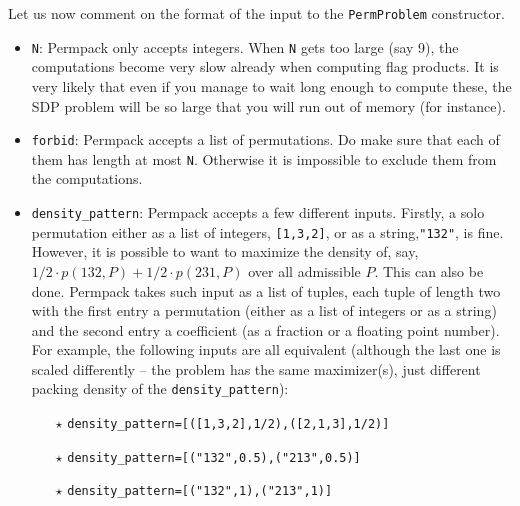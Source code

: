 Let us now comment on the format of the input to the \texttt{PermProblem} constructor. 
\begin{itemize}
\item \texttt{N}: Permpack only accepts integers. When \texttt{N} gets too large (say 9), the computations become very slow already when computing flag products. It is very likely that even if you manage to wait long enough to compute these, the SDP problem will be so large that you will run out of memory (for instance).
\item \texttt{forbid}: Permpack accepts a list of permutations. Do make sure that each of them has length at most \texttt{N}. Otherwise it is impossible to exclude them from the computations.
\item \texttt{density\_pattern}: Permpack accepts a few different inputs. Firstly, a solo permutation either as a list of integers, \texttt{[1,3,2]}, or as a string,\texttt{"132"}, is fine. However, it is possible to want to maximize the density of, say, $1/2\cdot p(132,P) + 1/2\cdot p(231,P)$ over all admissible $P$. This can also be done. Permpack takes such input as a list of tuples, each tuple of length two with the first entry a permutation (either as a list of integers or as a string) and the second entry a coefficient (as a fraction or a floating point number). For example, the following inputs are all equivalent (although the last one is scaled differently -- the problem has the same maximizer(s), just different packing density of the \texttt{density\_pattern}):
\begin{itemize}
\item[$\star$] \texttt{density\_pattern=[([1,3,2],1/2),([2,1,3],1/2)]}
\item[$\star$] \texttt{density\_pattern=[("132",0.5),("213",0.5)]}
\item[$\star$] \texttt{density\_pattern=[("132",1),("213",1)]}
\end{itemize}
\end{itemize}

